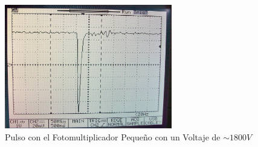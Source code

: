  \begin{figure}[htp!]
     \centering
     \includegraphics[width=0.65\textwidth,height=0.30\textheight]{images/venezuela/pulsopmt.jpg}
     \caption{Pulso con el Fotomultiplicador Pequeño con un Voltaje de $\sim 1800V$} 
     \end{figure}  
 
  
